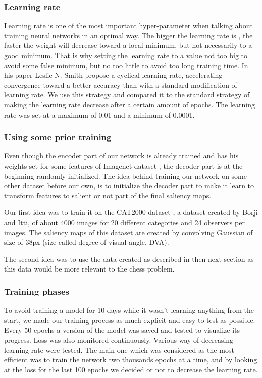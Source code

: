 \subsubsection{Learning rate} 
Learning rate is one of the most important hyper-parameter when talking about training neural networks in an optimal way.
The bigger the learning rate is , the faster the weight will decrease toward a local minimum, but not necessarily to a good minimum.
That is why setting the learning rate to a value not too big to avoid some false minimum, but no too little to avoid too long training time. In his paper Leslie N. Smith \cite{DBLP:journals/corr/Smith15a} propose a cyclical learning rate, accelerating convergence toward a better accuracy than with a standard modification of learning rate. We use this strategy and compared it to the standard strategy of making the learning rate decrease after a certain amount of epochs. The learning rate was set at a maximum of 0.01 and a minimum of 0.0001.

\subsubsection{Using some prior training}

Even though the encoder part of our network is already trained and has his weights set for some features of Imagenet dataset \cite{imagenet_cvpr09}, the decoder part is at the beginning randomly initialized. The idea behind training our network on some other dataset before our own, is to initialize the decoder part to make it learn to transform features to salient or not part of the final saliency maps. 

Our first idea was to train it on the CAT2000 dataset \cite{DBLP:journals/corr/BorjiI15}, a dataset created by Borji and Itti, of about 4000 images for 20  different categories and 24 observers per images. The saliency maps of this dataset are created by convolving Gaussian of size  of 38px (size called degree of visual angle, DVA).

The second idea was to use the data created as described in then next section as this data would be more relevant to the chess problem.

\subsubsection{Training phases}

To avoid training a model for 10 days while it wasn't learning anything from the start, we made our training process as much explicit and easy to test as possible. Every 50 epochs a version of the model was saved and tested to visualize its progress. Loss was also monitored continuously. Various way of decreasing learning rate were tested. The main one which was considered as the most efficient was to train the network two thousands epochs at a time, and by looking at the loss for the last 100 epochs we decided or not to decrease the learning rate.

